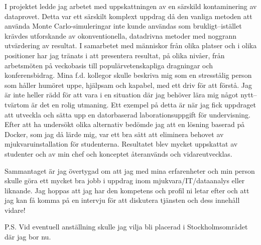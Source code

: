 \documentclass[11pt, a4paper]{../awesome-cv} %
\begin{document}
\begin{cvletter}
I projektet ledde jag arbetet med uppskattningen av en särskild kontaminering av dataprovet. %
Detta var ett särskilt komplext uppdrag då den vanliga metoden att använda Monte Carlo-simuleringar inte kunde användas som brukligt–istället krävdes utforskande av okonventionella, datadrivna metoder med noggrann utvärdering av resultat. %
I samarbetet med människor från olika platser och i olika positioner har jag tränats i att presentera resultat, på olika nivåer, från arbetsmöten på veckobasis till populärvetenskapliga dragningar och konferensbidrag.
Mina f.d. kollegor skulle beskriva mig som en stresstålig person som håller humöret uppe, hjälpsam och kapabel, med ett driv för att förstå. 
Jag är inte heller rädd för att vara i en situation där jag behöver lära mig något nytt–tvärtom är det en rolig utmaning. 
Ett exempel på detta är när jag fick uppdraget att utveckla och sätta upp en datorbaserad laborationsuppgift för undervisning.
Efter att ha undersökt olika alternativ bedömde jag att en lösning baserad på Docker, som jag då lärde mig, var ett bra sätt att eliminera behovet av mjukvaruinstallation för studenterna.
Resultatet blev mycket uppskattat av studenter och av min chef och konceptet återanvänds och vidareutvecklas.

Sammantaget är jag övertygad om att jag med mina erfarenheter och min person skulle göra ett mycket bra jobb i uppdrag inom mjukvara/IT/dataanalys eller liknande.
Jag hoppas att jag har den kompetens och profil ni letar efter och att jag kan få komma på en intervju för att diskutera tjänsten och dess innehåll vidare!


\end{cvletter}


\makeletterclosing %

P.S. Vid eventuell anställning skulle jag vilja bli placerad i Stockholmsområdet där jag bor nu. %
\end{document}
